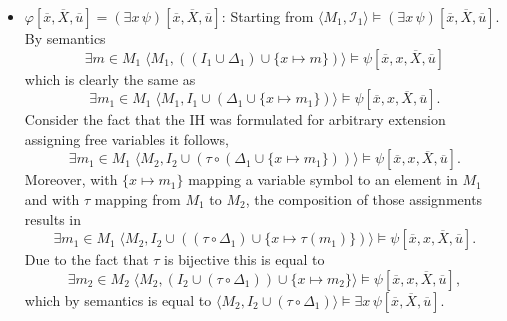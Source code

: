 \documentclass[11pt,a4paper]{article}
\begin{document}
\begin{itemize}[leftmargin=*]
\item  $\varphi[\overline{x}, \overline{X}, \overline{u}] = (\exists x \, \psi)[\overline{x}, \overline{X}, \overline{u}]$: Starting from $\langle M_1, \mathcal{I}_1 \rangle \models (\exists x \, \psi)[\overline{x}, \overline{X}, \overline{u}]$. By semantics  
\begin{equation*}
\exists m \in M_1 \; \langle M_1 , ((I_1 \cup \Delta_1) \cup \{x \mapsto m\}) \rangle \models \psi[\overline{x},x, \overline{X}, \overline{u}]
\end{equation*}
which is clearly the same as
\begin{equation*}
\exists m_1 \in M_1 \; \langle M_1 , I_1 \cup (\Delta_1 \cup \{x \mapsto m_1\}) \rangle \models \psi[\overline{x},x, \overline{X}, \overline{u}].
\end{equation*}
Consider the fact that the IH was formulated for arbitrary extension assigning free variables it follows,
 \begin{equation*}
\exists m_1 \in M_1 \;  \langle M_2 , I_2 \cup (\tau \circ (\Delta_1 \cup \{x \mapsto m_1\})) \rangle \models \psi[\overline{x},x, \overline{X}, \overline{u}].
\end{equation*} 
Moreover, with $\{x \mapsto m_1\}$ mapping a variable symbol to an element in $M_1$ and with $\tau$ mapping from $M_1$ to $M_2$, the composition of those assignments results in 
\begin{equation*}
\exists m_1 \in M_1 \;  \langle M_2 , I_2 \cup ((\tau \circ \Delta_1) \cup \{x \mapsto \tau (m_1)\}) \rangle \models \psi[\overline{x},x, \overline{X}, \overline{u}].
\end{equation*}
Due to the fact that $\tau$ is bijective this is equal to 
\begin{equation*}
\exists m_2 \in M_2 \;  \langle M_2 , (I_2 \cup (\tau \circ \Delta_1)) \cup \{x \mapsto m_2 \} \rangle \models \psi[\overline{x},x, \overline{X}, \overline{u}],
\end{equation*}
which by semantics is equal to $\langle M_2 , I_2 \cup (\tau \circ \Delta_1)\rangle \models \exists x \, \psi[\overline{x}, \overline{X}, \overline{u}]$. \\





\end{itemize}
\end{document}
